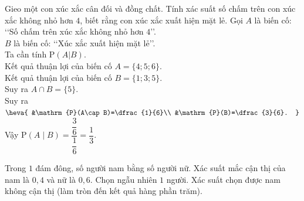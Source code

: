 \begin{ex}%
Gieo một con xúc xắc cân đối và đồng chất. Tính xác suất số chấm trên con xúc xắc không nhỏ hơn $4$, biết rằng con xúc xắc xuất hiện mặt lẻ.
\loigiai
{
Gọi $A$ là biến cố: \lq\lq Số chấm trên xúc xắc không nhỏ hơn $4$\rq\rq.\\
$B$ là biến cố: \lq\lq Xúc xắc xuất hiện mặt lẻ\rq\rq.\\
Ta cần tính $\mathrm{P}(A| B)$.\\
Kết quả thuận lợi của biến cố $A=\{4;5;6\}$.\\
Kết quả thuận lợi của biến cố $B=\{1;3;5\}$.\\
Suy ra $A\cap B=\{5\}$.\\
Suy ra $\heva{
&\mathrm{P}(A\cap B)=\dfrac{1}{6}\\
&\mathrm{P}(B)=\dfrac{3}{6}.
}$\\
Vậy $\mathrm{P}(A\mid B)=\dfrac{\dfrac{3}{6}}{\dfrac{1}{6}}=\dfrac{1}{3}$.
}
\end{ex}

\begin{ex}%
	Trong $1$ đám đông, số người nam bằng số người nữ. Xác suất mắc cận thị của nam là $0{,}4$ và nữ là $0{,}6$. Chọn ngẫu nhiên $1$ người. Xác suất chọn được nam không cận thị (làm tròn đến kết quả hàng phần trăm).
\end{ex}

